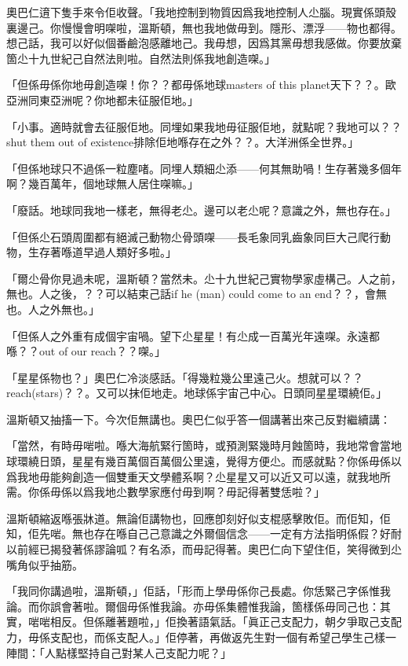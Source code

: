 奧巴仁逳下隻手來令佢收聲。「我地控制到物質因爲我地控制人尐腦。現實係頭殼裏邊己。你慢慢會明㗎啦，溫斯頓，無也我地做毋到。隱形、漂浮——物也都得。想己話，我可以好似個番鹼泡感離地己。我毋想，因爲其黨毋想我感做。你要放棄箇尐十九世紀己自然法則啦。自然法則係我地創造㗎。」

「但係毋係你地毋創造㗎！你？？都毋係地球masters of this planet天下？？。歐亞洲同東亞洲呢？你地都未征服佢地。」

「小事。適時就會去征服佢地。同埋如果我地毋征服佢地，就點呢？我地可以？？shut them out of existence排除佢地喺存在之外？？。大洋洲係全世界。」

「但係地球只不過係一粒塵啫。同埋人類細尐添——何其無助喎！生存著幾多個年啊？幾百萬年，個地球無人居住㗎嘛。」

「廢話。地球同我地一樣老，無得老尐。邊可以老尐呢？意識之外，無也存在。」

「但係尐石頭周圍都有絕滅己動物尐骨頭㗎——長毛象同乳齒象同巨大己爬行動物，生存著喺道早過人類好多啦。」

「爾尐骨你見過未呢，溫斯頓？當然未。尐十九世紀己實物學家虛構己。人之前，無也。人之後，？？可以結束己話if he (man) could come to an end？？，會無也。人之外無也。」

「但係人之外重有成個宇宙喎。望下尐星星！有尐成一百萬光年遠㗎。永遠都喺？？out of our reach？？㗎。」

「星星係物也？」奧巴仁冷淡感話。「得幾粒幾公里遠己火。想就可以？？reach(stars)？？。又可以抹佢地走。地球係宇宙己中心。日頭同星星環繞佢。」

溫斯頓又抽搐一下。今次佢無講也。奧巴仁似乎答一個講著出來己反對繼續講：

「當然，有時毋啱啦。喺大海航緊行箇時，或預測緊幾時月蝕箇時，我地常會當地球環繞日頭，星星有幾百萬個百萬個公里遠，覺得方便尐。而感就點？你係毋係以爲我地毋能夠創造一個雙重天文學體系啊？尐星星又可以近又可以遠，就我地所需。你係毋係以爲我地尐數學家應付毋到啊？毋記得著雙恁啦？」

溫斯頓縮返喺張牀道。無論佢講物也，回應卽刻好似支棍感擊敗佢。而佢知，佢知，佢先啱。無也存在喺自己己意識之外爾個信念——一定有方法指明係假？好耐以前經已揭發著係謬論呱？有名添，而毋記得著。奧巴仁向下望住佢，笑得微到尐嘴角似乎抽筋。

「我同你講過啦，溫斯頓，」佢話，「形而上學毋係你己長處。你恁緊己字係惟我論。而你誤會著啦。爾個毋係惟我論。亦毋係集體惟我論，箇樣係毋同己也：其實，啱啱相反。但係離著題啦，」佢換著語氣話。「眞正己支配力，朝夕爭取己支配力，毋係支配也，而係支配人。」佢停著，再做返先生對一個有希望己學生己樣一陣間：「人點樣堅持自己對某人己支配力呢？」

